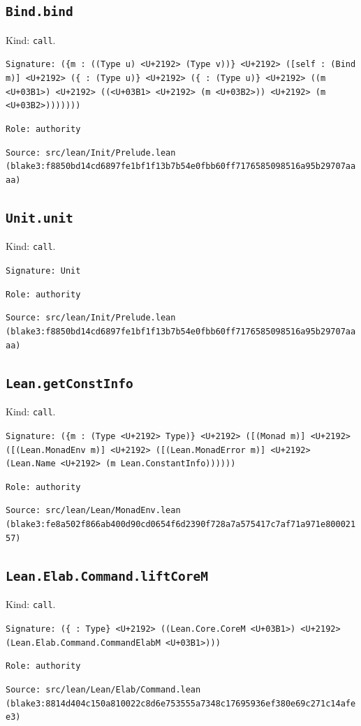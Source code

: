 \documentclass[11pt]{article}
\begin{document}
\subsection*{\texttt{Bind.bind}}
\noindent Kind: \texttt{call}.\par
\noindent \texttt{Signature: (\{m : ((Type u) <U+2192> (Type v))\} <U+2192> ([self : (Bind m)] <U+2192> (\{<U+03B1> : (Type u)\} <U+2192> (\{<U+03B2> : (Type u)\} <U+2192> ((m <U+03B1>) <U+2192> ((<U+03B1> <U+2192> (m <U+03B2>)) <U+2192> (m <U+03B2>)))))))}\par
\noindent \texttt{Role: authority}\par
\noindent \texttt{Source: src/lean/Init/Prelude.lean (blake3:f8850bd14cd6897fe1bf1f13b7b54e0fbb60ff7176585098516a95b29707aaaa)}\par
\subsection*{\texttt{Unit.unit}}
\noindent Kind: \texttt{call}.\par
\noindent \texttt{Signature: Unit}\par
\noindent \texttt{Role: authority}\par
\noindent \texttt{Source: src/lean/Init/Prelude.lean (blake3:f8850bd14cd6897fe1bf1f13b7b54e0fbb60ff7176585098516a95b29707aaaa)}\par
\subsection*{\texttt{Lean.getConstInfo}}
\noindent Kind: \texttt{call}.\par
\noindent \texttt{Signature: (\{m : (Type <U+2192> Type)\} <U+2192> ([(Monad m)] <U+2192> ([(Lean.MonadEnv m)] <U+2192> ([(Lean.MonadError m)] <U+2192> (Lean.Name <U+2192> (m Lean.ConstantInfo))))))}\par
\noindent \texttt{Role: authority}\par
\noindent \texttt{Source: src/lean/Lean/MonadEnv.lean (blake3:fe8a502f866ab400d90cd0654f6d2390f728a7a575417c7af71a971e80002157)}\par
\subsection*{\texttt{Lean.Elab.Command.liftCoreM}}
\noindent Kind: \texttt{call}.\par
\noindent \texttt{Signature: (\{<U+03B1> : Type\} <U+2192> ((Lean.Core.CoreM <U+03B1>) <U+2192> (Lean.Elab.Command.CommandElabM <U+03B1>)))}\par
\noindent \texttt{Role: authority}\par
\noindent \texttt{Source: src/lean/Lean/Elab/Command.lean (blake3:8814d404c150a810022c8d6e753555a7348c17695936ef380e69c271c14afee3)}\par
\end{document}
